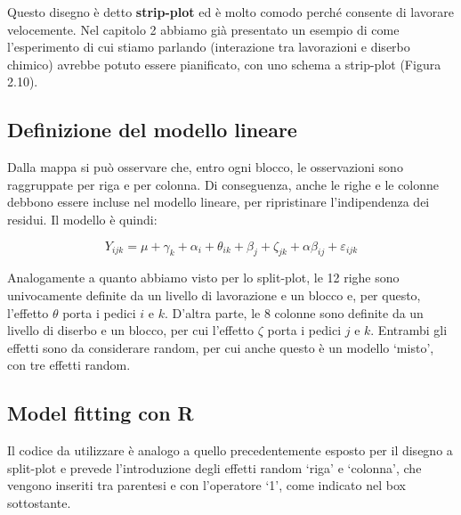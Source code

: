 \documentclass[a4paper,12pt,oneside]{book}
\begin{document}
Questo disegno è detto \textbf{strip-plot} ed è molto comodo perché consente di lavorare velocemente. Nel capitolo 2 abbiamo già presentato un esempio di come l'esperimento di cui stiamo parlando (interazione tra lavorazioni e diserbo chimico) avrebbe potuto essere pianificato, con uno schema a strip-plot (Figura 2.10).

\hypertarget{definizione-del-modello-lineare-4}{%
\subsection{Definizione del modello lineare}\label{definizione-del-modello-lineare-4}}

Dalla mappa si può osservare che, entro ogni blocco, le osservazioni sono raggruppate per riga e per colonna. Di conseguenza, anche le righe e le colonne debbono essere incluse nel modello lineare, per ripristinare l'indipendenza dei residui. Il modello è quindi:

\[Y_{ijk} = \mu + \gamma_k + \alpha_i + \theta_{ik} + \beta_j + \zeta_{jk} + \alpha\beta_{ij} + \varepsilon_{ijk}\]

Analogamente a quanto abbiamo visto per lo split-plot, le 12 righe sono univocamente definite da un livello di lavorazione e un blocco e, per questo, l'effetto \(\theta\) porta i pedici \(i\) e \(k\). D'altra parte, le 8 colonne sono definite da un livello di diserbo e un blocco, per cui l'effetto \(\zeta\) porta i pedici \(j\) e \(k\). Entrambi gli effetti sono da considerare random, per cui anche questo è un modello `misto', con tre effetti random.

\hypertarget{model-fitting-con-r-1}{%
\subsection{Model fitting con R}\label{model-fitting-con-r-1}}

Il codice da utilizzare è analogo a quello precedentemente esposto per il disegno a split-plot e prevede l'introduzione degli effetti random `riga' e `colonna', che vengono inseriti tra parentesi e con l'operatore `1\textbar{}', come indicato nel box sottostante.
\end{document}
